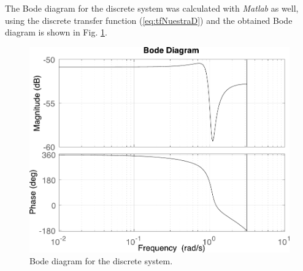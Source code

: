 The Bode diagram for the discrete system was calculated with \textit{Matlab} as well, using the discrete transfer function (\ref{eq:tfNuestraD}) and the obtained Bode diagram is shown in Fig. \ref{fig:discreteBode}.
\begin{figure}[ht]
    \centering
    \includegraphics[scale=0.5]{figs/discreteBodeDiagram.pdf}
    \caption{Bode diagram for the discrete system.}
    \label{fig:discreteBode}
\end{figure}

